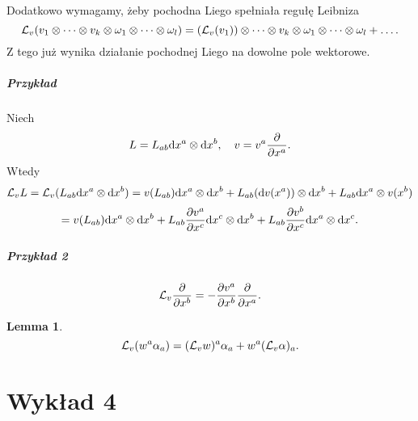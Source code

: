 \documentclass[11pt]{book}
\theoremstyle{definition} %
\theoremstyle{plain} %
\newtheorem{lemma}[theorem]{Lemma}
\theoremstyle{remark} %
\theoremstyle{underline}
\begin{document}
  Dodatkowo wymagamy, żeby pochodna Liego spełniała regułę Leibniza
  \begin{displaymath}
    \mathcal{L}_v(v_1\otimes \dots \otimes v_k \otimes \omega_1\otimes\dots \otimes \omega_l) = 
    (\mathcal{L}_v(v_1))\otimes \dots \otimes v_k \otimes \omega_1\otimes \dots \otimes\omega_l + \dots.
  \end{displaymath}
  Z tego już wynika działanie pochodnej Liego na dowolne pole wektorowe.


  \paragraph{Przykład} 
  Niech 
  \begin{displaymath}
    L = L_{ab} \mathrm{d} x^a \otimes \mathrm{d} x^b, \quad v = v^a \frac{\partial }{\partial x^a}.
  \end{displaymath}
  Wtedy 
  \begin{displaymath}
    \mathcal{L}_vL = \mathcal{L}_v(L_{ab} \mathrm{d} x^a \otimes \mathrm{d} x^b) = v(L_{ab}) \mathrm{d} x^a \otimes \mathrm{d} x^b 
    + L_{ab} (\mathrm{d} v(x^a)) \otimes \mathrm{d} x^b
    + L_{ab} \mathrm{d} x^a\otimes v(x^b)
  \end{displaymath}
  \begin{displaymath}
    = v(L_{ab}) \mathrm{d} x^a \otimes \mathrm{d} x^b  
    + L_{ab} \frac{\partial v^a}{\partial x^c}\mathrm{d} x^c \otimes \mathrm{d} x^b
    + L_{ab} \frac{\partial v^b}{\partial x^c}\mathrm{d} x^a \otimes \mathrm{d} x^c.
  \end{displaymath}
  
  
  \paragraph{Przykład 2}
  \begin{displaymath}
    \mathcal{L}_v \frac{\partial }{\partial x^b} = - \frac{\partial v^a}{\partial x^b}\frac{\partial }{\partial x^a}.
  \end{displaymath}

  \begin{lemma}
    \begin{displaymath}
      \mathcal{L}_v(w^a \alpha_a) = (\mathcal{L}_v w)^a\alpha_a + w^a (\mathcal{L}_v\alpha)_a.
    \end{displaymath}
    
  \end{lemma}

  \chapter{Wykład 4}
\end{document}
